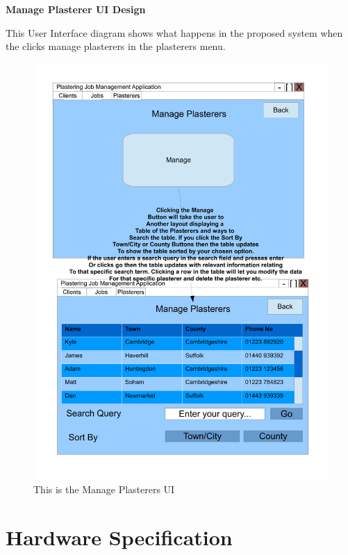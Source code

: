\pagebreak
\textbf{Manage Plasterer UI Design}
\begin{flushleft}
This User Interface diagram shows what happens in the proposed system when the clicks manage plasterers in the plasterers menu.
\end{flushleft}
\begin{figure}[H]
\includegraphics[scale=0.5]{./Design/images/ManagePlasterers.pdf}
    \caption{This is the Manage Plasterers UI} 
\label{fig:FlowChartManagePlasterers}
\end{figure}

\pagebreak
\section{Hardware Specification}

